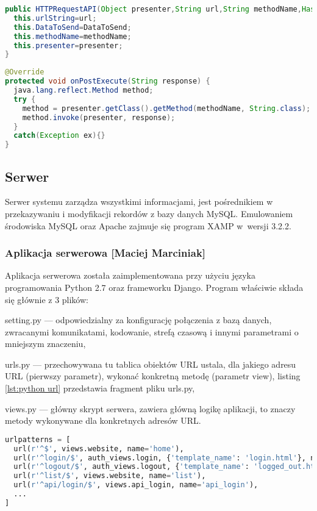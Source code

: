 \documentclass[twoside,10pt]{article}
\def\StudentA     {Maciej Marciniak}
\begin{document}
\begin{lstlisting}[caption={Konstruktor klasy HTTPRequest.}, label={lst:kod6}, language=Java]
public HTTPRequestAPI(Object presenter,String url,String methodName,HashMap DataToSend) {
  this.urlString=url;
  this.DataToSend=DataToSend;
  this.methodName=methodName;
  this.presenter=presenter;
}
\end{lstlisting}

\begin{lstlisting}[caption={Metoda OnPost zwracająca odpowied"z serwera.}, label={lst:kod7}, language=Java]
@Override
protected void onPostExecute(String response) {
  java.lang.reflect.Method method;
  try {
    method = presenter.getClass().getMethod(methodName, String.class);
    method.invoke(presenter, response);
  }
  catch(Exception ex){}
}
\end{lstlisting}

\subsection{Serwer}
Serwer systemu zarządza wszystkimi informacjami, jest pośrednikiem w przekazywaniu i modyfikacji rekordów z bazy danych MySQL. Emulowaniem środowiska MySQL oraz Apache zajmuje się program XAMP w~wersji 3.2.2.

\subsubsection{Aplikacja serwerowa [\StudentA]}\label{sec:apk serw}
Aplikacja serwerowa została zaimplementowana przy użyciu języka programowania Python 2.7 oraz frameworku Django. Program  właściwie składa się głównie z 3 plików:
\begin{itemize*}
\item setting.py --- odpowiedzialny za konfigurację połączenia z bazą danych, zwracanymi komunikatami, kodowanie, strefą czasową i innymi parametrami o mniejszym znaczeniu,
\item urls.py --- przechowywana tu tablica obiektów URL ustala, dla jakiego adresu URL (pierwszy parametr), wykonać konkretną metodę (parametr view), listing \ref{lst:python url} przedstawia fragment pliku urls.py,
\item views.py --- główny skrypt serwera, zawiera główną logikę aplikacji, to znaczy metody wykonywane dla konkretnych adresów URL.
\end{itemize*}

{\footnotesize 
\begin{lstlisting}[caption={Fragment pliku urls.py}, label={lst:python url}, language=Python]
urlpatterns = [
  url(r'^$', views.website, name='home'),
  url(r'^login/$', auth_views.login, {'template_name': 'login.html'}, name='login'),
  url(r'^logout/$', auth_views.logout, {'template_name': 'logged_out.html'}, name='logout'),
  url(r'^list/$', views.website, name='list'),
  url(r'^api/login/$', views.api_login, name='api_login'),
  ...
]
\end{lstlisting}}
\end{document}
